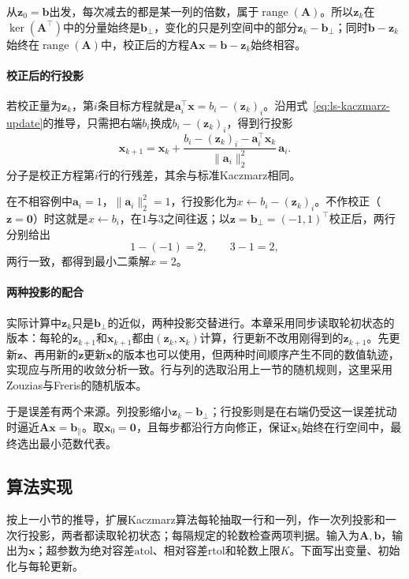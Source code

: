 从$\bm z_0=\bm b$出发，每次减去的都是某一列的倍数，属于$\operatorname{range}(\bm A)$。所以$\bm z_k$在$\ker(\bm A^\top)$中的分量始终是$\bm b_\perp$，变化的只是列空间中的部分$\bm z_k-\bm b_\perp$；同时$\bm b-\bm z_k$始终在$\operatorname{range}(\bm A)$中，校正后的方程$\bm A\bm x=\bm b-\bm z_k$始终相容。

\paragraph{校正后的行投影}
若校正量为$\bm z_k$，第$i$条目标方程就是$\bm a_i^\top\bm x=b_i-(\bm z_k)_i$。沿用式~\eqref{eq:ls-kaczmarz-update}的推导，只需把右端$b_i$换成$b_i-(\bm z_k)_i$，得到行投影
\begin{equation}
 \bm x_{k+1}=\bm x_k+\frac{b_i-(\bm z_k)_i-\bm a_i^\top\bm x_k}{\lVert\bm a_i\rVert_2^2}\,\bm a_i .
 \label{eq:ls-extended-kaczmarz-row}
\end{equation}
分子是校正方程第$i$行的行残差，其余与标准Kaczmarz相同。

在不相容例中$\bm a_i=1$，$\lVert\bm a_i\rVert_2^2=1$，行投影化为$x\gets b_i-(\bm z_k)_i$。不作校正（$\bm z=\bm0$）时这就是$x\gets b_i$，在$1$与$3$之间往返；以$\bm z=\bm b_\perp=(-1,1)^\top$校正后，两行分别给出
\[
 1-(-1)=2,\qquad 3-1=2 ,
\]
两行一致，都得到最小二乘解$x=2$。

\paragraph{两种投影的配合}
实际计算中$\bm z_k$只是$\bm b_\perp$的近似，两种投影交替进行。本章采用同步读取轮初状态的版本：每轮的$\bm z_{k+1}$和$\bm x_{k+1}$都由$(\bm z_k,\bm x_k)$计算，行更新不改用刚得到的$\bm z_{k+1}$。先更新$\bm z$、再用新的$\bm z$更新$\bm x$的版本也可以使用，但两种时间顺序产生不同的数值轨迹，实现应与所用的收敛分析一致。行与列的选取沿用上一节的随机规则，这里采用Zouzias与Freris的随机版本。

于是误差有两个来源。列投影缩小$\bm z_k-\bm b_\perp$；行投影则是在右端仍受这一误差扰动时逼近$\bm A\bm x=\bm b_\parallel$。取$\bm x_0=\bm0$，且每步都沿行方向修正，保证$\bm x_k$始终在行空间中，最终选出最小范数代表。

\subsection{算法实现}

按上一小节的推导，扩展Kaczmarz算法每轮抽取一行和一列，作一次列投影和一次行投影，两者都读取轮初状态；每隔规定的轮数检查两项判据。输入为$\bm A,\bm b$，输出为$\bm x$；超参数为绝对容差$\mathrm{atol}$、相对容差$\mathrm{rtol}$和轮数上限$K$。下面写出变量、初始化与每轮更新。


